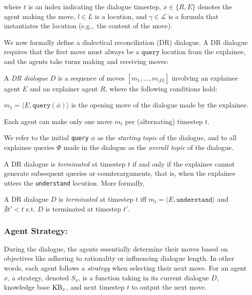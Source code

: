 \documentclass{article}
\begin{document}
\noindent where $t$ is an index indicating the dialogue timestep, $x\in \{R, E\}$ denotes the agent making the move, $l\in L$ is a locution, and $\gamma \in \mathcal{L}$ is a formula that instantiates the locution (e.g.,~the content of the move). 


We now formally define a dialectical reconciliation (DR) dialogue. A DR dialogue requires that the first move must always be a $\texttt{query}$ locution from the explainee, and the agents take turns making and receiving moves:


\begin{definition}[DR Dialogue]
A \emph{DR dialogue} $D$ is a sequence of moves $[m_1,\ldots, m_{|D|}]$ involving an explainee agent $E$ and an explainer agent $R$, where the following conditions hold:
\squishenum
\item[1.] $m_1 = \langle E, \texttt{query}(\phi) \rangle$ is the opening move of the dialogue made by the explainee.
\item[2.] Each agent can make only one move $m_t$ per (alternating) timestep $t$.
\squishend
\label{DR_dialogue_def}
\end{definition}

\noindent We refer to the initial \texttt{query} $\phi$ as the \textit{starting topic} of the dialogue, and to all explainee queries $\Phi$ made in the dialogue as the \emph{overall topic} of the dialogue.







A DR dialogue is \emph{terminated} at timestep $t$ if and only if the explainee cannot generate subsequent queries or counterarguments, that is, when the explainee utters the \texttt{understand} locution. More formally,

\begin{definition}
\label{def:term}
    A DR dialogue $D$ is \emph{terminated} at timestep $t$ iff $m_t = \langle E, \texttt{understand} \rangle$ and $\nexists t'<t$ s.t. $D$ is terminated at timestep $t'$.
\end{definition}

\subsubsection{Agent Strategy:} 
During the dialogue, the agents essentially determine their moves based on objectives like adhering to rationality or influencing dialogue length. In other words, each agent follows a \emph{strategy} when selecting their next move. For an agent $x$, a strategy, denoted $S_x$, is a function taking in its current dialogue $D$, knowledge base $\mathrm{KB}_x$, and next timestep $t$ to output the next move. 
\end{document}
